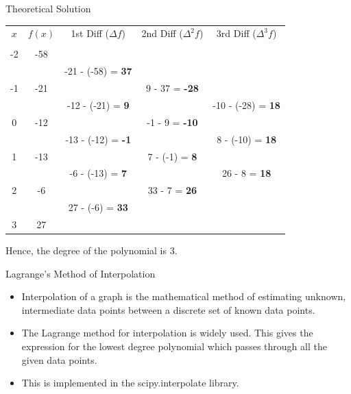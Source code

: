 \documentclass{beamer}
\begin{document}
\begin{frame}{Theoretical Solution}

\begin{center}
\begin{tabular}{ccccc}
$x$ & $f(x)$ & 1st Diff ($\Delta f$) & 2nd Diff ($\Delta^2 f$) & 3rd Diff ($\Delta^3 f$) \\
\\
-2 & -58 & & & & \\
   &     & -21 - (-58) = \textbf{37} & & \\
-1 & -21 & & 9 - 37 = \textbf{-28} & \\
   &     & -12 - (-21) = \textbf{9} & & -10 - (-28) = \textbf{18} \\
 0 & -12 & & -1 - 9 = \textbf{-10} & \\
   &     & -13 - (-12) = \textbf{-1} & & 8 - (-10) = \textbf{18} \\
 1 & -13 & & 7 - (-1) = \textbf{8} & \\
   &     & -6 - (-13) = \textbf{7} & & 26 - 8 = \textbf{18} \\
 2 &  -6 & & 33 - 7 = \textbf{26} & \\
   &     & 27 - (-6) = \textbf{33} & & \\
 3 &  27 & & & & \\
\end{tabular}
\end{center}

Hence, the degree of the polynomial is 3. 
    
\end{frame}

\begin{frame}{Lagrange's Method of Interpolation}

\begin{itemize}
    \item Interpolation of a graph is the mathematical method of estimating unknown, intermediate data points between a discrete set of known data points.
    \item The Lagrange method for interpolation is widely used. This gives the expression for the lowest degree polynomial which passes through all the given data points. 
    \item This is implemented in the scipy.interpolate library. 
\end{itemize}
    
\end{frame}
\end{document}
